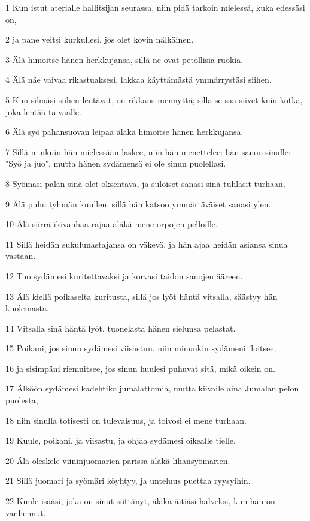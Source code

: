 \par 1 Kun istut aterialle hallitsijan seurassa, niin pidä tarkoin mielessä, kuka edessäsi on,
\par 2 ja pane veitsi kurkullesi, jos olet kovin nälkäinen.
\par 3 Älä himoitse hänen herkkujansa, sillä ne ovat petollisia ruokia.
\par 4 Älä näe vaivaa rikastuaksesi, lakkaa käyttämästä ymmärrystäsi siihen.
\par 5 Kun silmäsi siihen lentävät, on rikkaus mennyttä; sillä se saa siivet kuin kotka, joka lentää taivaalle.
\par 6 Älä syö pahansuovan leipää äläkä himoitse hänen herkkujansa.
\par 7 Sillä niinkuin hän mielessään laskee, niin hän menettelee: hän sanoo sinulle: "Syö ja juo", mutta hänen sydämensä ei ole sinun puolellasi.
\par 8 Syömäsi palan sinä olet oksentava, ja suloiset sanasi sinä tuhlasit turhaan.
\par 9 Älä puhu tyhmän kuullen, sillä hän katsoo ymmärtäväiset sanasi ylen.
\par 10 Älä siirrä ikivanhaa rajaa äläkä mene orpojen pelloille.
\par 11 Sillä heidän sukulunastajansa on väkevä, ja hän ajaa heidän asiansa sinua vastaan.
\par 12 Tuo sydämesi kuritettavaksi ja korvasi taidon sanojen ääreen.
\par 13 Älä kiellä poikaselta kuritusta, sillä jos lyöt häntä vitsalla, säästyy hän kuolemasta.
\par 14 Vitsalla sinä häntä lyöt, tuonelasta hänen sielunsa pelastat.
\par 15 Poikani, jos sinun sydämesi viisastuu, niin minunkin sydämeni iloitsee;
\par 16 ja sisimpäni riemuitsee, jos sinun huulesi puhuvat sitä, mikä oikein on.
\par 17 Älköön sydämesi kadehtiko jumalattomia, mutta kiivaile aina Jumalan pelon puolesta,
\par 18 niin sinulla totisesti on tulevaisuus, ja toivosi ei mene turhaan.
\par 19 Kuule, poikani, ja viisastu, ja ohjaa sydämesi oikealle tielle.
\par 20 Älä oleskele viininjuomarien parissa äläkä lihansyömärien.
\par 21 Sillä juomari ja syömäri köyhtyy, ja unteluus puettaa ryysyihin.
\par 22 Kuule isääsi, joka on sinut siittänyt, äläkä äitiäsi halveksi, kun hän on vanhennut.
